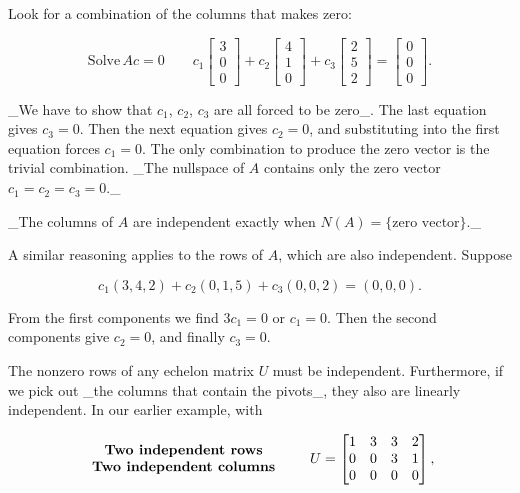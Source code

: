 Look for a combination of the columns that makes zero:

\[\text{Solve}\,Ac=0\qquad c_{1}\begin{bmatrix}3\\ 0\\ 0\end{bmatrix}+c_{2}\begin{bmatrix}4\\ 1\\ 0\end{bmatrix}+c_{3}\begin{bmatrix}2\\ 5\\ 2\end{bmatrix}=\begin{bmatrix}0\\ 0\\ 0\end{bmatrix}.\]

_We have to show that \(c_{1}\), \(c_{2}\), \(c_{3}\) are all forced to be zero_. The last equation gives \(c_{3}=0\). Then the next equation gives \(c_{2}=0\), and substituting into the first equation forces \(c_{1}=0\). The only combination to produce the zero vector is the trivial combination. _The nullspace of \(A\) contains only the zero vector \(c_{1}=c_{2}=c_{3}=0\)._

_The columns of \(A\) are independent exactly when \(N(A)=\{\text{zero vector}\}\)._

A similar reasoning applies to the rows of \(A\), which are also independent. Suppose

\[c_{1}(3,4,2)+c_{2}(0,1,5)+c_{3}(0,0,2)=(0,0,0).\]

From the first components we find \(3c_{1}=0\) or \(c_{1}=0\). Then the second components give \(c_{2}=0\), and finally \(c_{3}=0\).

The nonzero rows of any echelon matrix \(U\) must be independent. Furthermore, if we pick out _the columns that contain the pivots_, they also are linearly independent. In our earlier example, with

\[\begin{array}{c}\text{\bf Two independent rows}\\ \text{\bf Two independent columns}\end{array}\qquad U=\begin{bmatrix}1&3&3&2\\ 0&0&3&1\\ 0&0&0&0\end{bmatrix},\]

